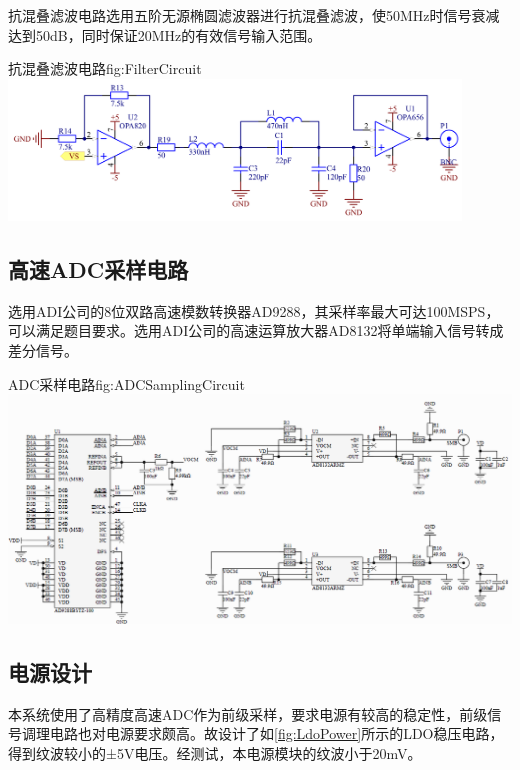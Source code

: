 \documentclass[supercite]{HustGraduPaper}
\begin{document}
	抗混叠滤波电路选用五阶无源椭圆滤波器进行抗混叠滤波，使50MHz时信号衰减达到50dB，同时保证20MHz的有效信号输入范围。
	\begin{generalfig}[htb]{抗混叠滤波电路}{fig:FilterCircuit}
		\includegraphics[width=12cm]{Figures/FilterCircuit.png}
	\end{generalfig}
	
	\subsection{高速ADC采样电路}
	
	选用ADI公司的8位双路高速模数转换器AD9288，其采样率最大可达100MSPS，可以满足题目要求。选用ADI公司的高速运算放大器AD8132将单端输入信号转成差分信号。
	\begin{generalfig}[htb]{ADC采样电路}{fig:ADCSamplingCircuit}
		\includegraphics[width=\textwidth]{Figures/ADCSamplingCircuit.png}
	\end{generalfig}
	
	
	\subsection{电源设计}
	本系统使用了高精度高速ADC作为前级采样，要求电源有较高的稳定性，前级信号调理电路也对电源要求颇高。故设计了如\autoref{fig:LdoPower}所示的LDO稳压电路，得到纹波较小的±5V电压。经测试，本电源模块的纹波小于20mV。
	
\end{document}

